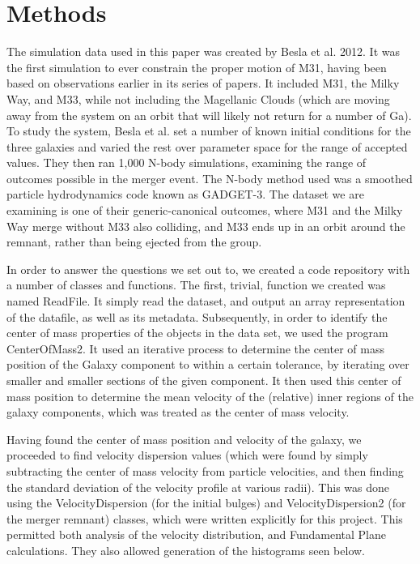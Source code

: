 \documentclass[iop]{emulateapj}
\begin{document}
\section{Methods}

The simulation data used in this paper was created by Besla et al. 2012. It was the first simulation to ever constrain the proper motion of M31, having been based on observations earlier in its series of papers. It included M31, the Milky Way, and M33, while not including the Magellanic Clouds (which are moving away from the system on an orbit that will likely not return for a number of Ga). To study the system, Besla et al. set a number of known initial conditions for the three galaxies and varied the rest over parameter space for the range of accepted values. They then ran 1,000 N-body simulations, examining the range of outcomes possible in the merger event. The N-body method used was a smoothed particle hydrodynamics code known as GADGET-3. The dataset we are examining is one of their generic-canonical outcomes, where M31 and the Milky Way merge without M33 also colliding, and M33 ends up in an orbit around the remnant, rather than being ejected from the group. 

In order to answer the questions we set out to, we created a code repository with a number of classes and functions. The first, trivial, function we created was named ReadFile. It simply read the dataset, and output an array representation of the datafile, as well as its metadata. Subsequently, in order to identify the center of mass properties of the objects in the data set, we used the program CenterOfMass2. It used an iterative process to determine the center of mass position of the Galaxy component to within a certain tolerance, by iterating over smaller and smaller sections of the given component. It then used this center of mass position to determine the mean velocity of the (relative) inner regions of the galaxy components, which was treated as the center of mass velocity.

Having found the center of mass position and velocity of the galaxy, we proceeded to find velocity dispersion values (which were found by simply subtracting the center of mass velocity from particle velocities, and then finding the standard deviation of the velocity profile at various radii). This was done using the VelocityDispersion (for the initial bulges) and VelocityDispersion2 (for the merger remnant) classes, which were written explicitly for this project. This permitted both analysis of the velocity distribution, and Fundamental Plane calculations. They also allowed generation of the histograms seen below.
\end{document}
